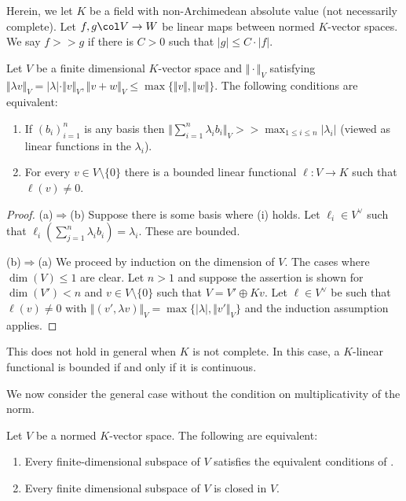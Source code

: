 Herein, we let $K$ be a field with non-Archimedean absolute value (not necessarily complete). Let $f,g\col V\to W$ be linear maps between normed
$K$-vector spaces. We say $f>>g$ if there is $C>0$ such that $|g|\leq C\cdot|f|$. 
\begin{proposition}\label{prop: equivalent conditions on vector spaces}
    Let $V$ be a finite dimensional $K$-vector space and $\Vert\cdot\Vert_{V}$ satisfying $\Vert \lambda v\Vert_{V}=|\lambda|\cdot\Vert v\Vert_{V}, \Vert v+w\Vert_{V}\leq\max\{\Vert v\Vert,\Vert w\Vert\}$. The following conditions are equivalent: 
    \begin{enumerate}[label=(\roman*)]
        \item If $(b_{i})_{i=1}^{n}$ is any basis then $\Vert\sum_{i=1}^{n}\lambda_{i}b_{i}\Vert_{V}>>\max_{1\leq i\leq n}|\lambda_{i}|$ (viewed as linear functions in the $\lambda_i$). 
        \item For every $v\in V\setminus\{0\}$ there is a bounded linear functional $\ell:V\to K$ such that $\ell(v)\neq0$. 
    \end{enumerate}
\end{proposition}
\begin{proof}
    (a)$\Rightarrow$(b) Suppose there is some basis where (i) holds. Let $\ell_{i}\in V^{\vee}$ such that $\ell_{i}\left(\sum_{j=1}^{n}\lambda_{i}b_{i}\right)=\lambda_{i}$. These are bounded. 

    (b)$\Rightarrow$(a) We proceed by induction on the dimension of $V$. The cases where $\dim(V)\leq 1$ are clear. Let $n>1$ and suppose the assertion is shown for $\dim(V')<n$ and $v\in V\setminus\{0\}$ such that $V=V'\oplus Kv$. Let $\ell\in V^{\vee}$ be such that $\ell(v)\neq0$ with $\Vert (v',\lambda v)\Vert_{V}=\max\{|\lambda|,\Vert v'\Vert_{V}\}$ and the induction assumption applies. 
\end{proof}
\begin{remark}
    This does not hold in general when $K$ is not complete. In this case, a $K$-linear functional is bounded if and only if it is continuous. 
\end{remark}
We now consider the general case without the condition on multiplicativity of the norm. 
\begin{proposition}\label{prop: finite subspace is closed}
    Let $V$ be a normed $K$-vector space. The following are equivalent:
    \begin{enumerate}[label=(\alph*)]
        \item Every finite-dimensional subspace of $V$ satisfies the equivalent conditions of . 
        \item Every finite dimensional subspace of $V$ is closed in $V$. 
    \end{enumerate}
\end{proposition}

